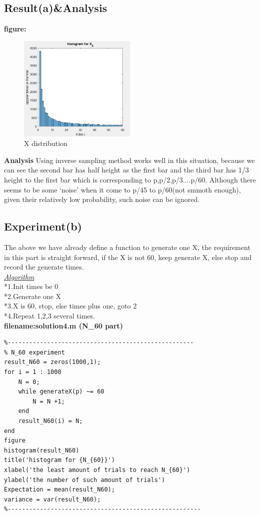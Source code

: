 \documentclass[twoside]{article}
\begin{document}
\subsection{\normalsize{Result(a)\&Analysis}}
\begin{multicols}{2}
\noindent \textbf {figure:}\\
\begin{figure}[H]
   \centering
   \includegraphics[width = 0.50\textwidth]{../data/solution4.png}  
   \caption{X distribution}
\end{figure}
\noindent \textbf {Analysis}
Using inverse sampling method works well in this situation, because we can see the second bar has half height as the first bar and the third bar has 1/3 height to the first bar which is corresponding to p,p/2,p/3....p/60. Although there seems to be some `noise' when it come to p/45 to p/60(not smmoth enough), given their relatively low probability, such noise can be ignored.\\
\end{multicols}
\subsection{\normalsize{Experiment(b)}}
\noindent The above we have already define a function to generate one X, the requirement in this part is straight forward, if the X is not 60, keep generate X, else stop and record the generate times.\\[10pt]
\underline{\emph{Algorithm}}\\[10pt]
*1.Init times be 0\\
*2.Generate one X\\
*3.X is 60, stop, else times plus one, goto 2\\
*4.Repeat 1,2,3 several times.\\
\noindent \textbf {filename:solution4.m (N\_60 part)}\\
\begin{lstlisting}
%----------------------------------------------------
% N_60 experiment
result_N60 = zeros(1000,1);
for i = 1 : 1000
    N = 0;
    while generateX(p) ~= 60
        N = N +1;
    end
    result_N60(i) = N;
end
figure
histogram(result_N60)
title('histogram for {N_{60}}')
xlabel('the least amount of trials to reach N_{60}')
ylabel('the number of such amount of trials')
Expectation = mean(result_N60);
variance = var(result_N60);
%------------------------------------------------------
\end{lstlisting}
\end{document}
